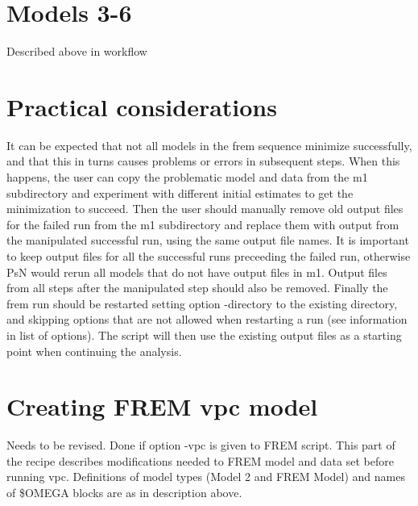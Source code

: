 \section{Models 3-6}

Described above in workflow




\section{Practical considerations}
It can be expected that not all models in the frem sequence minimize successfully, and that this in turns 
causes problems or errors in subsequent steps. 
When this happens, the user can copy the problematic model and data from the m1 subdirectory and experiment with
different initial estimates to get the minimization to succeed. Then the user should manually remove old output files for the
failed run from the m1 subdirectory and replace them with output from the manipulated successful run, using the same 
output file names. It is important to keep output files for all the successful runs preceeding the failed run, 
otherwise PsN would rerun all models that do not have output files
in m1. Output files from all steps after the manipulated step should also be removed.
Finally the frem run should be restarted setting option -directory to the existing directory, and skipping 
options that are not allowed when restarting a run (see information in list of options). The script
will then use the existing output files as a starting point when continuing the analysis.


\section{Creating FREM vpc model}
Needs to be revised.
Done if option -vpc is given to FREM script. This part of the recipe describes modifications needed to FREM model and data set before running vpc. Definitions of model types (Model 2 and FREM Model) and names of \$OMEGA blocks are as in description above. 

